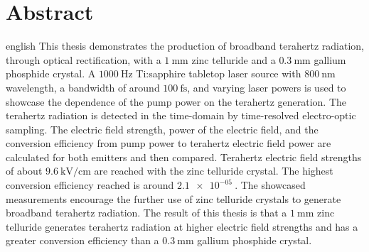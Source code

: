 \thispagestyle{plain}

\section*{Abstract}
\begin{foreignlanguage}{english}
This thesis demonstrates the production of broadband terahertz radiation, through optical rectification, with a $\SI{1}{\milli\meter}$ zinc telluride and a $\SI{0.3}{\milli\meter}$ gallium phosphide crystal.
A $\SI{1000}{\hertz}$ Ti:sapphire tabletop laser source with $\SI{800}{\nano\meter}$ wavelength, a bandwidth of around $\SI{100}{\femto\second}$, and varying laser powers is used to showcase the dependence of the pump power on the terahertz generation.
The terahertz radiation is detected in the time-domain by time-resolved electro-optic sampling.
The electric field strength, power of the electric field, and the conversion efficiency from pump power to terahertz electric field power are calculated for both emitters and then compared.
Terahertz electric field strengths of about $\SI{9.6}{\kilo\V\per\centi\meter}$ are reached with the zinc telluride crystal.
The highest conversion efficiency reached is around $\SI{2.1e-05}{}$.
The showcased measurements encourage the further use of zinc telluride crystals to generate broadband terahertz radiation.
The result of this thesis is that a $\SI{1}{\milli\meter}$ zinc telluride generates terahertz radiation at higher electric field strengths and has a greater conversion efficiency than a $\SI{0.3}{\milli\meter}$ gallium phosphide crystal. 
\end{foreignlanguage}
